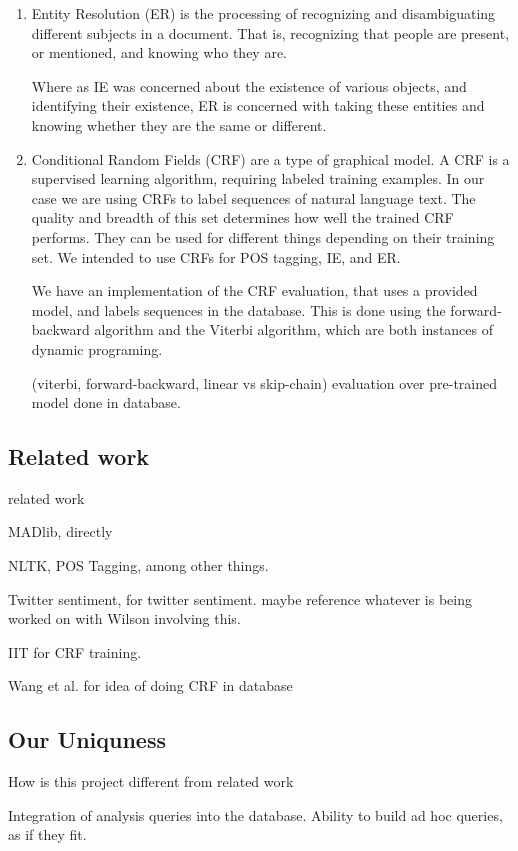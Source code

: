 \documentclass{article}
\begin{document}
\begin{enumerate}
\begin{enumerate}
  \item Entity Resolution (ER) is the processing of recognizing and disambiguating different subjects in a document.
    That is, recognizing that people are present,
    or mentioned, and knowing who they are.

    Where as IE was concerned about the existence of various objects,
    and identifying their existence,
    ER is concerned with taking these entities and knowing whether they are the same or different.


  \item Conditional Random Fields (CRF) are a type of graphical model.
    A CRF is a supervised learning algorithm, requiring labeled training examples.
    In our case we are using CRFs to label sequences of natural language text.
    The quality and breadth of this set determines how well the trained CRF performs.
    They can be used for different things depending on their training set.
    We intended to use CRFs for POS tagging, IE, and ER.

    We have an implementation of the CRF evaluation, that uses a provided model, and labels sequences in the database.
    This is done using the forward-backward algorithm and the Viterbi algorithm, which are both instances of dynamic programing.

    (viterbi, forward-backward, linear vs skip-chain) evaluation over pre-trained model done in database.

  \end{enumerate}
\subsection{Related work}

    related work

    MADlib, directly

    NLTK, POS Tagging, among other things.

    Twitter sentiment, for twitter sentiment. maybe reference whatever is being worked on with Wilson involving this.

    IIT for CRF training.

    Wang et al. for idea of doing CRF in database

\subsection{Our Uniquness}
 How is this project different from related work

    Integration of analysis queries into the database.
    Ability to build ad hoc queries, as if they fit.


\end{enumerate}
\end{document}
